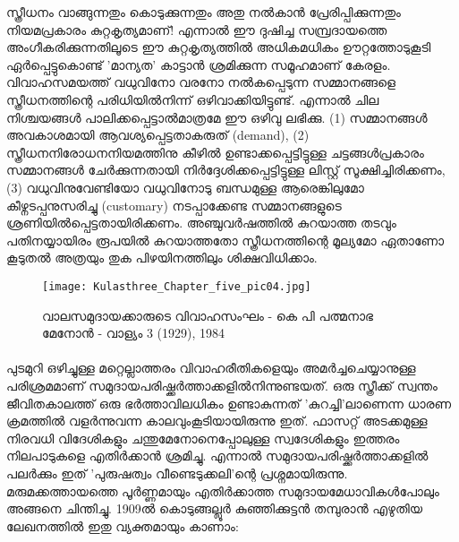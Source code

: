 \label{ch5box5} %
\begin{tcolorbox}[%
 breakable, %
  arc=0mm, 
  left=1pt, right = 1pt, 
  boxrule=0mm,
  colback = {blue!10}, %
] 
സ്ത്രീധനം വാങ്ങുന്നതും കൊടുക്കുന്നതും അതു നൽകാൻ പ്രേരിപ്പിക്കുന്നതും നിയമപ്രകാരം കുറ്റകൃത്യമാണ്! എന്നാൽ ഈ ദുഷിച്ച സമ്പ്രദായത്തെ അംഗീകരിക്കുന്നതിലൂടെ ഈ കുറ്റകൃത്യത്തിൽ അധികമധികം ഊറ്റത്തോടുകൂടി ഏർപ്പെട്ടുകൊണ്ട് 'മാന്യത' കാട്ടാൻ ശ്രമിക്കുന്ന സമൂഹമാണ് കേരളം. വിവാഹസമയത്ത് വധുവിനോ വരനോ നൽകപ്പെടുന്ന സമ്മാനങ്ങളെ സ്ത്രീധനത്തിന്റെ പരിധിയിൽനിന്ന് ഒഴിവാക്കിയിട്ടുണ്ട്. എന്നാൽ ചില നിശ്ചയങ്ങൾ പാലിക്കപ്പെട്ടാൽമാത്രമേ ഈ ഒഴിവു ലഭിക്കു. (1) സമ്മാനങ്ങൾ അവകാശമായി ആവശ്യപ്പെട്ടതാകരുത് (demand), (2) സ്ത്രീധനനിരോധനനിയമത്തിനു കീഴിൽ ഉണ്ടാക്കപ്പെട്ടിട്ടുള്ള ചട്ടങ്ങൾപ്രകാരം സമ്മാനങ്ങൾ ചേർക്കുന്നതായി നിർദ്ദേശിക്കപ്പെട്ടിട്ടുള്ള ലിസ്റ്റ് സൂക്ഷിച്ചിരിക്കണം, (3) വധുവിനുവേണ്ടിയോ വധുവിനോടു ബന്ധമുള്ള ആരെങ്കിലുമോ കീഴ്നടപ്പനുസരിച്ചു (customary) നടപ്പാക്കേണ്ട സമ്മാനങ്ങളുടെ ശ്രണിയിൽപ്പെട്ടതായിരിക്കണം. അഞ്ചുവർഷത്തിൽ കുറയാത്ത തടവും പതിനയ്യായിരം രൂപയിൽ കുറയാത്തതോ സ്ത്രീധനത്തിന്റെ മൂല്യമോ ഏതാണോ കൂടുതൽ അത്രയും തുക പിഴയിനത്തിലും ശിക്ഷവിധിക്കാം.
\end{tcolorbox}

\begin{figure}[h]
\begin{center}
\texttt{[image: Kulasthree\_Chapter\_five\_pic04.jpg]}
\end{center}
\caption*{വാലസമുദായക്കാരുടെ വിവാഹസംഘം - കെ പി പത്മനാഭ മേനോൻ - വാള്യം 3 (1929), 1984}
\end{figure}

\paragraph{}പുടമുറി ഒഴിച്ചുള്ള മറ്റെല്ലാത്തരം വിവാഹരീതികളെയും അമർച്ചചെയ്യാനുള്ള പരിശ്രമമാണ് സമുദായപരിഷ്ക്കർത്താക്കളിൽനിന്നുണ്ടയത്. ഒരു സ്ത്രീക്ക് സ്വന്തം ജീവിതകാലത്ത് ഒരു ഭർത്താവിലധികം ഉണ്ടാകുന്നത് 'കുറച്ചി'ലാണെന്ന ധാരണ ക്രമത്തിൽ വളർന്നുവന്ന കാലവുംകൂടിയായിരുന്നു ഇത്. ഫാസറ്റ് അടക്കമുള്ള നിരവധി വിദേശികളും ചന്തുമേനോനെപ്പോലുള്ള സ്വദേശികളും ഇത്തരം നിലപാടുകളെ എതിർക്കാൻ ശ്രമിച്ചു. എന്നാൽ സമുദായപരിഷ്ക്കർത്താക്കളിൽ പലർക്കും ഇത് 'പുരുഷത്വം വീണ്ടെടുക്കലി'ന്റെ പ്രശ്നമായിരുന്നു. മരുമക്കത്തായത്തെ പൂർണ്ണമായും എതിർക്കാത്ത സമുദായമേധാവികൾപോലും അങ്ങനെ ചിന്തിച്ചു. 1909ൽ കൊടുങ്ങല്ലൂർ കുഞ്ഞിക്കുട്ടൻ തമ്പുരാൻ എഴുതിയ ലേഖനത്തിൽ ഇതു വ്യക്തമായും കാണാം:

